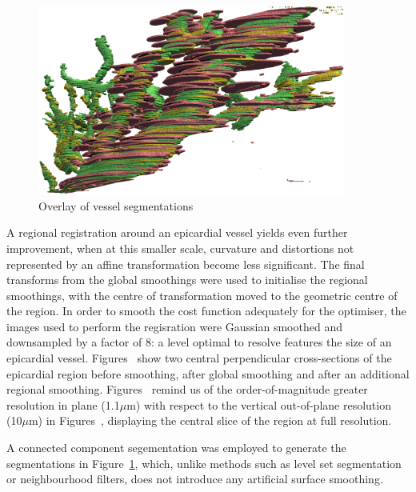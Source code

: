     \begin{figure}
      \centering
      \includegraphics[width=0.9\textwidth]{Ch6/Figs/bottom_vessels/vessel_overlay}
      \caption{Overlay of vessel segmentations}
      \label{fig:vessel_segmentations}
    \end{figure}
    
    A regional registration around an epicardial vessel yields even further improvement, when at this smaller scale, curvature and distortions not represented by an affine transformation become less significant. The final transforms from the global smoothings were used to initialise the regional smoothings, with the centre of transformation moved to the geometric centre of the region. In order to smooth the cost function adequately for the optimiser, the images used to perform the regisration were Gaussian smoothed and downsampled by a factor of 8: a level optimal to resolve features the size of an epicardial vessel. Figures~ show two central perpendicular cross-sections of the epicardial region before smoothing, after global smoothing and after an additional regional smoothing. Figures~ remind us of the order-of-magnitude greater resolution in plane (1.1$\mu$m) with respect to the vertical out-of-plane resolution (10$\mu$m) in Figures~, displaying the central slice of the region at full resolution.
    
    A connected component segementation was employed to generate the segmentations in Figure~\ref{fig:vessel_segmentations}, which, unlike methods such as level set segmentation or neighbourhood filters, does not introduce any artificial surface smoothing.

